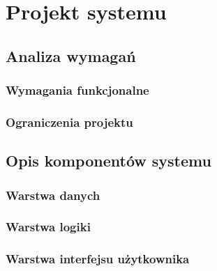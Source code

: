 \chapter{Projekt systemu}

\section{Analiza wymagań}
\subsection{Wymagania funkcjonalne}
\subsection{Ograniczenia projektu}

\section{Opis komponentów systemu}
\subsection{Warstwa danych}
\subsection{Warstwa logiki}
\subsection{Warstwa interfejsu użytkownika}